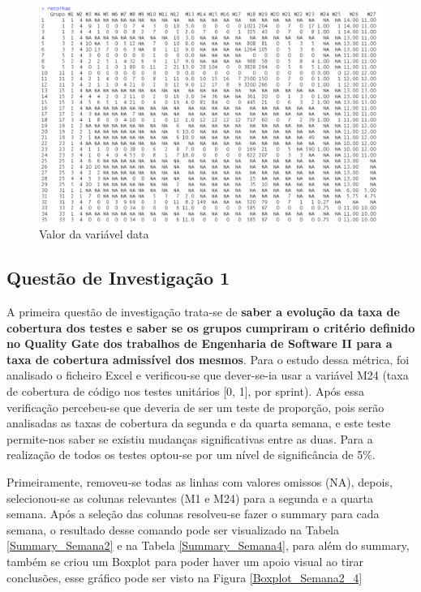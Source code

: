 \documentclass[%
 aip,
cp,  %
 amsmath,amssymb,%
 reprint,%
]{revtex4-2}
\begin{document}
\begin{figure}[h]
    \centering
    \includegraphics[width=1\linewidth]{imagens/Output_Variavel recolhas.png}
    \caption{Valor da variável data}
    \label{fig:enter-label}
\end{figure}

\newpage

\subsection{Questão de Investigação 1}
A primeira questão de investigação trata-se de \textbf{saber a evolução da taxa de cobertura dos testes e saber se os grupos cumpriram o critério definido no Quality Gate dos trabalhos de Engenharia de Software II para a taxa de cobertura admissível dos mesmos}. Para o estudo dessa métrica, foi analisado o ficheiro Excel e verificou-se que dever-se-ia usar a variável M24 (taxa de cobertura de código nos testes unitários [0, 1], por sprint). Após essa verificação percebeu-se que deveria de ser um teste de proporção, pois serão analisadas as taxas de cobertura da segunda e da quarta semana, e este teste permite-nos saber se existiu mudanças significativas entre as duas. Para a realização de todos os testes optou-se por um nível de significância de 5\%.

\vspace{0.5cm}

Primeiramente, removeu-se todas as linhas com valores omissos (NA), depois, selecionou-se as colunas relevantes (M1 e M24) para a segunda e a quarta semana. Após a seleção das colunas resolveu-se fazer o summary para cada semana, o resultado desse comando pode ser visualizado na Tabela \ref{Summary_Semana2} e na Tabela \ref{Summary_Semana4}, para além do summary, também se criou um Boxplot para poder haver um apoio visual ao tirar conclusões, esse gráfico pode ser visto na Figura \ref{Boxplot_Semana2_4}
\end{document}
